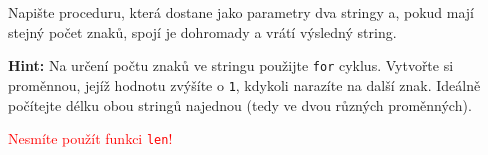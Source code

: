 \question[70]
Napište proceduru, která dostane jako parametry dva stringy a, pokud mají stejný
počet znaků, spojí je dohromady a vrátí výsledný string.

\textbf{Hint:} Na určení počtu znaků ve stringu použijte \texttt{for} cyklus.
Vytvořte si proměnnou, jejíž hodnotu zvýšíte o \texttt{1}, kdykoli narazíte na
další znak. Ideálně počítejte délku obou stringů najednou (tedy ve dvou různých
proměnných).

\textcolor{red}{Nesmíte použít funkci \texttt{len}!}
